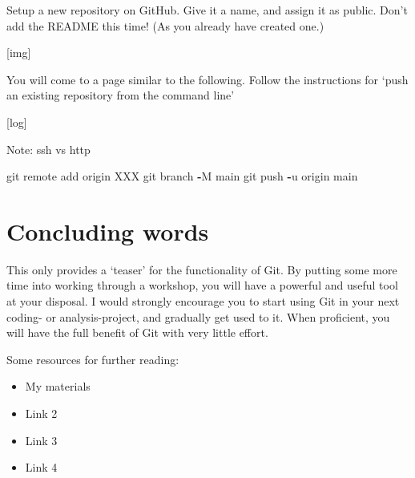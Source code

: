 \documentclass[]{article}
\newenvironment{Shaded}{\begin{snugshade}}{\end{snugshade}}
\newcommand{\NormalTok}[1]{#1}
\newcommand{\OperatorTok}[1]{\textcolor[rgb]{0.81,0.36,0.00}{\textbf{#1}}}
\providecommand{\tightlist}{%
  \setlength{\itemsep}{0pt}\setlength{\parskip}{0pt}}
\begin{document}
Setup a new repository on GitHub. Give it a name, and assign it as
public. Don't add the README this time! (As you already have created
one.)

{[}img{]}

You will come to a page similar to the following. Follow the
instructions for `push an existing repository from the command line'

{[}log{]}

Note: ssh vs http

\begin{Shaded}
\begin{Highlighting}[]
\NormalTok{git remote add origin XXX}
\NormalTok{git branch }\OperatorTok{-}\NormalTok{M main}
\NormalTok{git push }\OperatorTok{-}\NormalTok{u origin main}
\end{Highlighting}
\end{Shaded}

\hypertarget{concluding-words}{%
\section{Concluding words}\label{concluding-words}}

This only provides a `teaser' for the functionality of Git. By putting
some more time into working through a workshop, you will have a powerful
and useful tool at your disposal. I would strongly encourage you to
start using Git in your next coding- or analysis-project, and gradually
get used to it. When proficient, you will have the full benefit of Git
with very little effort.

Some resources for further reading:

\begin{itemize}
\tightlist
\item
  My materials
\item
  Link 2
\item
  Link 3
\item
  Link 4
\end{itemize}
\end{document}
